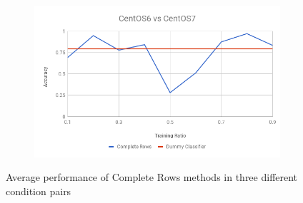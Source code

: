 \documentclass[10pt, conference, compsocconf]{IEEEtran}
\begin{document}
\begin{figure}[h!]
\begin{subfigure}[b]{0.8\linewidth}
                \includegraphics[width=\columnwidth]{figures/ALS/rows-ALS-6vs7-PFS}
        \end{subfigure}
        \caption{Average performance of Complete Rows methods in three different condition pairs}
        \label{fig:rows method}
\end{figure}
\end{document}
